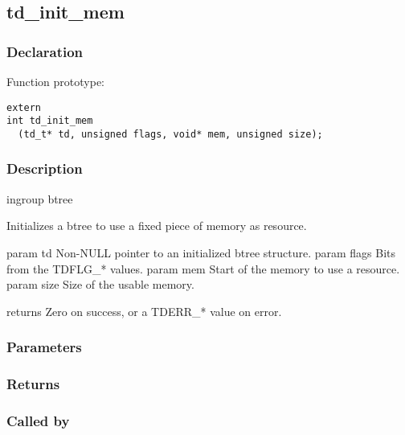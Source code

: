 
\newpage
\subsection{td\_init\_mem}
\subsubsection{Declaration} Function prototype:

\begin{verbatim}
extern
int td_init_mem
  (td_t* td, unsigned flags, void* mem, unsigned size);
\end{verbatim}

\subsubsection{Description}


 ingroup btree

 Initializes a btree to use a fixed piece of memory as resource.

 param td Non-NULL pointer to an initialized btree structure.
 param flags Bits from the TDFLG\_* values.
 param mem Start of the memory to use a resource.
 param size Size of the usable memory.

 returns Zero on success, or a TDERR\_* value on error.
 

\subsubsection{Parameters}
\subsubsection{Returns}
\subsubsection{Called by}

